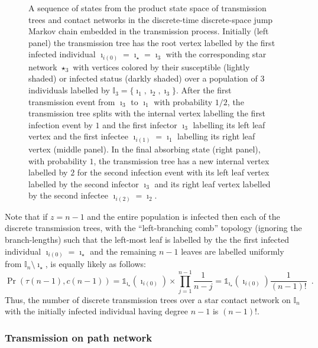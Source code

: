\documentclass[review]{elsarticle}
\numberwithin{equation}{section}
\newcommand{\bI}{{\mathbb I}}
\begin{document}
\begin{figure}
\begin{center}
\begin {center}
\scalebox{.75}{

}
\end{center}
\caption{A sequence of states from the product state space of transmission trees and contact networks in the discrete-time discrete-space jump Markov chain embedded in the transmission process.  
Initially (left panel) the transmission tree has the root vertex labelled by the first infected individual $\imath_{i(0)} = \imath_{\star} = \imath_3$ with the corresponding star network $\star_3$ with vertices colored by their susceptible (lightly shaded) or infected status (darkly shaded) over a population of $3$ individuals labelled by $\bI_3=\{\imath_1,\imath_2,\imath_3\}$.  
After the first transmission event from $\imath_3$ to $\imath_1$ with probability $1/2$, 
the transmission tree splits with the internal vertex labelling the first infection event by $1$ and the first infector $\imath_3$ labelling its left leaf vertex and the first infectee $\imath_{i(1)}=\imath_1$ labelling its right leaf vertex (middle panel).  
In the final absorbing state (right panel), with probability $1$, the transmission tree has a new internal vertex labelled by $2$ for the second infection event with its left leaf vertex labelled by the second infector $\imath_3$ and its right leaf vertex labelled by the second infectee $\imath_{i(2)}=\imath_2$.\label{F:transTreeNetworkStar}}
\end{center}
\end{figure}

Note that if $z=n-1$ and the entire population is infected then each of the discrete transmission trees, 
with the ``left-branching comb'' topology (ignoring the branch-lengths) such that the left-most leaf is labelled by the the first infected individual $\imath_{i(0)}=\imath_{\star}$ and the remaining $n-1$ leaves are labelled uniformly from $\bI_n \setminus \imath_{\star}$, is equally likely as follows:
\[
\Pr(\tau(n-1),c(n-1)) = \mathds{1}_{\imath_{\star}}(\imath_{i(0)}) \times \prod_{j=1}^{n-1}  \frac{1}{n-j} = \mathds{1}_{\imath_{\star}}(\imath_{i(0)}) \frac{1}{(n-1)!} \enspace.
\]
Thus, the number of discrete transmission trees over a star contact network on $\bI_n$ with the initially infected individual having degree $n-1$ is $(n-1)!$.

\subsubsection{Transmission on path network}\label{EX:TrPathNetwork}
\end{document}
